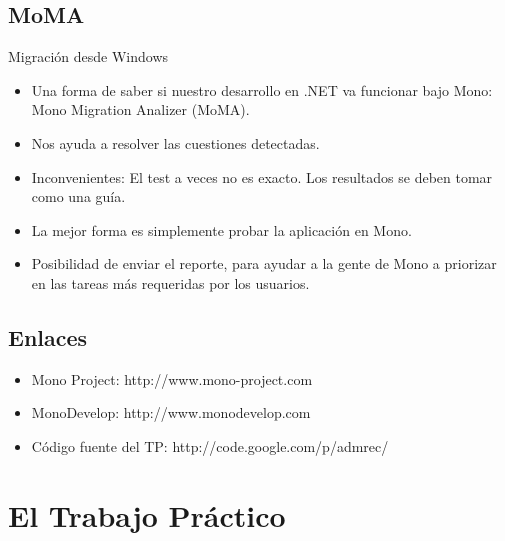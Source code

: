 \documentclass{beamer}
\begin{document}
\subsection{MoMA}

\begin{frame}{Migración desde Windows}
  \begin{itemize}
    \item Una forma de saber si nuestro desarrollo en .NET va funcionar
      bajo Mono: Mono Migration Analizer (MoMA).
    \item Nos ayuda a resolver las cuestiones detectadas.
    \item \alert{Inconvenientes:} El test a veces no es exacto. Los resultados
      se deben tomar como una guía.
    \item La mejor forma es simplemente probar la aplicación en Mono.
    \item Posibilidad de enviar el reporte, para ayudar a la gente de Mono
      a priorizar en las tareas más requeridas por los usuarios.
  \end{itemize}
\end{frame}


\subsection{Enlaces}

\begin{frame}
  \begin{itemize}
    \item Mono Project: http://www.mono-project.com
    \item MonoDevelop: http://www.monodevelop.com
    \item Código fuente del TP: http://code.google.com/p/admrec/
  \end{itemize}
\end{frame}


\section{El Trabajo Práctico}
\end{document}

